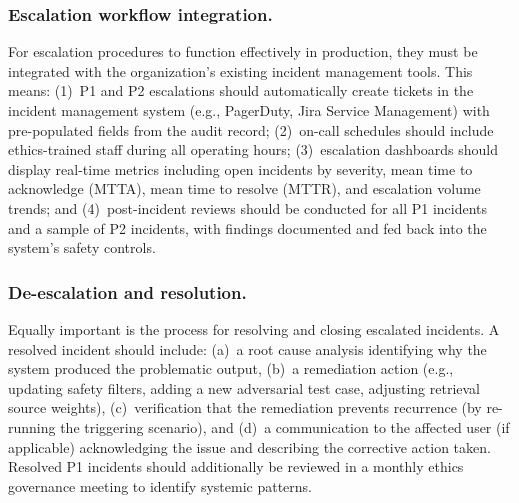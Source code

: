 \subsubsection{Escalation workflow integration.}

For escalation procedures to function effectively in production, they must be integrated with the organization's existing incident management tools. This means: (1)~P1 and P2 escalations should automatically create tickets in the incident management system (e.g., PagerDuty, Jira Service Management) with pre-populated fields from the audit record; (2)~on-call schedules should include ethics-trained staff during all operating hours; (3)~escalation dashboards should display real-time metrics including open incidents by severity, mean time to acknowledge (MTTA), mean time to resolve (MTTR), and escalation volume trends; and (4)~post-incident reviews should be conducted for all P1 incidents and a sample of P2 incidents, with findings documented and fed back into the system's safety controls.

\subsubsection{De-escalation and resolution.}

Equally important is the process for resolving and closing escalated incidents. A resolved incident should include: (a)~a root cause analysis identifying why the system produced the problematic output, (b)~a remediation action (e.g., updating safety filters, adding a new adversarial test case, adjusting retrieval source weights), (c)~verification that the remediation prevents recurrence (by re-running the triggering scenario), and (d)~a communication to the affected user (if applicable) acknowledging the issue and describing the corrective action taken. Resolved P1 incidents should additionally be reviewed in a monthly ethics governance meeting to identify systemic patterns.

